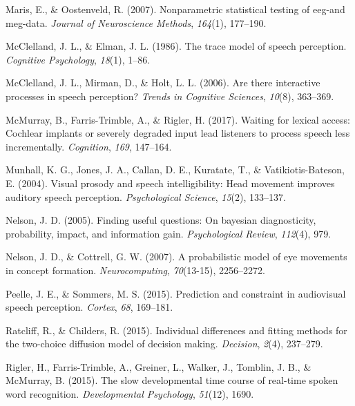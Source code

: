 \documentclass[,man,floatsintext]{apa6}
\begin{document}
\leavevmode\hypertarget{ref-maris2007nonparametric}{}%
Maris, E., \& Oostenveld, R. (2007). Nonparametric statistical testing
of eeg-and meg-data. \emph{Journal of Neuroscience Methods},
\emph{164}(1), 177--190.

\leavevmode\hypertarget{ref-mcclelland1986trace}{}%
McClelland, J. L., \& Elman, J. L. (1986). The trace model of speech
perception. \emph{Cognitive Psychology}, \emph{18}(1), 1--86.

\leavevmode\hypertarget{ref-mcclelland2006there}{}%
McClelland, J. L., Mirman, D., \& Holt, L. L. (2006). Are there
interactive processes in speech perception? \emph{Trends in Cognitive
Sciences}, \emph{10}(8), 363--369.

\leavevmode\hypertarget{ref-mcmurray2017waiting}{}%
McMurray, B., Farris-Trimble, A., \& Rigler, H. (2017). Waiting for
lexical access: Cochlear implants or severely degraded input lead
listeners to process speech less incrementally. \emph{Cognition},
\emph{169}, 147--164.

\leavevmode\hypertarget{ref-munhall2004visual}{}%
Munhall, K. G., Jones, J. A., Callan, D. E., Kuratate, T., \&
Vatikiotis-Bateson, E. (2004). Visual prosody and speech
intelligibility: Head movement improves auditory speech perception.
\emph{Psychological Science}, \emph{15}(2), 133--137.

\leavevmode\hypertarget{ref-nelson2005finding}{}%
Nelson, J. D. (2005). Finding useful questions: On bayesian
diagnosticity, probability, impact, and information gain.
\emph{Psychological Review}, \emph{112}(4), 979.

\leavevmode\hypertarget{ref-nelson2007probabilistic}{}%
Nelson, J. D., \& Cottrell, G. W. (2007). A probabilistic model of eye
movements in concept formation. \emph{Neurocomputing}, \emph{70}(13-15),
2256--2272.

\leavevmode\hypertarget{ref-peelle2015prediction}{}%
Peelle, J. E., \& Sommers, M. S. (2015). Prediction and constraint in
audiovisual speech perception. \emph{Cortex}, \emph{68}, 169--181.

\leavevmode\hypertarget{ref-ratcliff2015individual}{}%
Ratcliff, R., \& Childers, R. (2015). Individual differences and fitting
methods for the two-choice diffusion model of decision making.
\emph{Decision}, \emph{2}(4), 237--279.

\leavevmode\hypertarget{ref-rigler2015slow}{}%
Rigler, H., Farris-Trimble, A., Greiner, L., Walker, J., Tomblin, J. B.,
\& McMurray, B. (2015). The slow developmental time course of real-time
spoken word recognition. \emph{Developmental Psychology}, \emph{51}(12),
1690.
\end{document}
